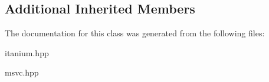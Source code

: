 \subsection*{Additional Inherited Members}


The documentation for this class was generated from the following files\+:\begin{DoxyCompactItemize}
\item 
itanium.\+hpp\item 
msvc.\+hpp\end{DoxyCompactItemize}
